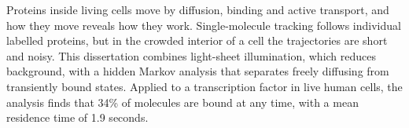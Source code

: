 Proteins inside living cells move by diffusion, binding and active transport, and how they move
reveals how they work. Single-molecule tracking follows individual labelled proteins, but in
the crowded interior of a cell the trajectories are short and noisy. This dissertation combines
light-sheet illumination, which reduces background, with a hidden Markov analysis that
separates freely diffusing from transiently bound states. Applied to a transcription factor in
live human cells, the analysis finds that 34\% of molecules are bound at any time, with a mean
residence time of 1.9 seconds.
